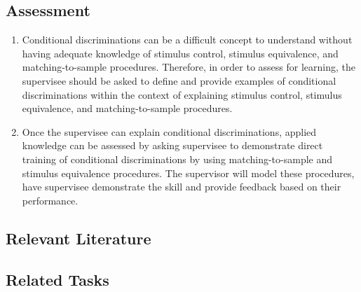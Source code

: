\subsection{Assessment}
\begin{enumerate}
\item Conditional discriminations can be a difficult concept to understand without having adequate knowledge of stimulus control, stimulus equivalence, and matching-to-sample procedures.  Therefore, in order to assess for learning, the supervisee should be asked to define and provide examples of conditional discriminations within the context of explaining stimulus control, stimulus equivalence, and matching-to-sample procedures.
\item Once the supervisee can explain conditional discriminations, applied knowledge can be assessed by asking supervisee to demonstrate direct training of conditional discriminations by using matching-to-sample and stimulus equivalence procedures.  The supervisor will model these procedures, have supervisee demonstrate the skill and provide feedback based on their performance.  
%
\end{enumerate}
%
\subsection{Relevant Literature}
\begin{refsection}
\nocite{bush1989contextual,
        carrigan1992conditional,
        cooper2007applied,
        johnson1993conditional,
        sidman1994equivalence}
\printbibliography[heading=none]
\end{refsection}
%
\subsection{Related Tasks}
\foureSix{}\\
\fourFKEleven{}\\
\fourFKTwentyFour{}\\
\fourFKThirtyFive{}\\
\fourFKThirtySeven{}\\
\fourjFourteen{}\\
